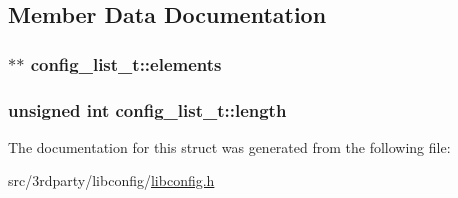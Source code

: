 \subsection{Member Data Documentation}
\hypertarget{structconfig__list__t_a8a0f0c428590f6630367748c0170c1ea}{
\subsubsection[{elements}]{$\ast$$\ast$ config\-\_\-list\-\_\-t\-::elements}}\label{structconfig__list__t_a8a0f0c428590f6630367748c0170c1ea}
\hypertarget{structconfig__list__t_a713729415280421d146ce4f590e33356}{
\subsubsection[{length}]{\setlength{\rightskip}{0pt plus 5cm}unsigned int config\-\_\-list\-\_\-t\-::length}}\label{structconfig__list__t_a713729415280421d146ce4f590e33356}


The documentation for this struct was generated from the following file\-:\begin{DoxyCompactItemize}
\item 
src/3rdparty/libconfig/\hyperlink{libconfig_8h}{libconfig.\-h}\end{DoxyCompactItemize}
